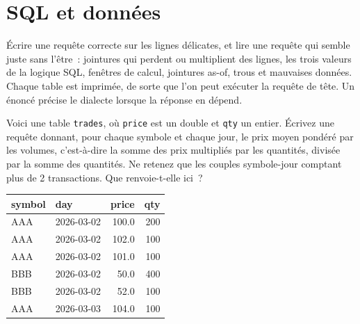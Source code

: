 \chapter{SQL et données}\label{ch:iv3:sql-and-data}

\begin{ivtrains}
Écrire une requête correcte sur les lignes délicates, et lire une requête qui semble juste sans l'être~: jointures qui perdent ou multiplient des lignes, les trois valeurs de la logique SQL, fenêtres de calcul, jointures as-of, trous et mauvaises données. Chaque table est imprimée, de sorte que l'on peut exécuter la requête de tête. Un énoncé précise le dialecte lorsque la réponse en dépend.
\end{ivtrains}

\begin{question}\label{iq:iv3:sql-and-data:1}
Voici une table \texttt{trades}, où \texttt{price} est un double et \texttt{qty} un entier. Écrivez une requête donnant, pour chaque symbole et chaque jour, le prix moyen pondéré par les volumes, c'est-à-dire la somme des prix multipliés par les quantités, divisée par la somme des quantités. Ne retenez que les couples symbole-jour comptant plus de 2 transactions. Que renvoie-t-elle ici~?
\begin{center}\small
\begin{tabular}{llrr}
symbol & day & price & qty\\\hline
AAA & 2026-03-02 & 100.0 & 200\\
AAA & 2026-03-02 & 102.0 & 100\\
AAA & 2026-03-02 & 101.0 & 100\\
BBB & 2026-03-02 & 50.0 & 400\\
BBB & 2026-03-02 & 52.0 & 100\\
AAA & 2026-03-03 & 104.0 & 100
\end{tabular}
\end{center}
\end{question}


